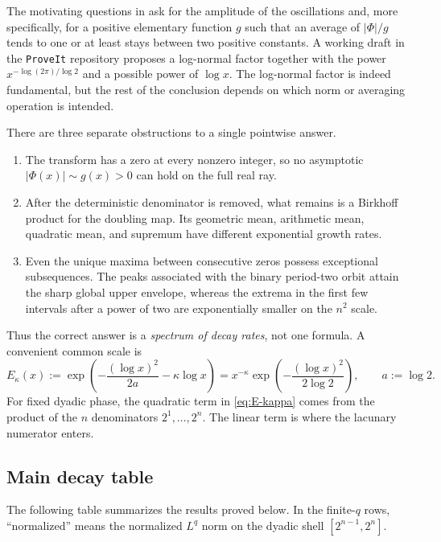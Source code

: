 \documentclass[11pt,oneside]{article}
\theoremstyle{definition}
\theoremstyle{remark}
\newcommand{\Phiup}{\Phi}
\newcommand{\abs}[1]{\left|#1\right|}
\begin{document}
The motivating questions in \cite{mse-extrema,mse-decay} ask for the amplitude of the
oscillations and, more specifically, for a positive elementary function $g$ such that an
average of $\abs{\Phiup}/g$ tends to one or at least stays between two positive constants.
A working draft in the \texttt{ProveIt} repository \cite{decay-draft} proposes a log-normal
factor together with the power $x^{-\log(2\pi)/\log2}$ and a possible power of $\log x$.
The log-normal factor is indeed fundamental, but the rest of the conclusion depends on
which norm or averaging operation is intended.

There are three separate obstructions to a single pointwise answer.

\begin{enumerate}
\item The transform has a zero at every nonzero integer, so no asymptotic
      $\abs{\Phiup(x)}\sim g(x)>0$ can hold on the full real ray.
\item After the deterministic denominator is removed, what remains is a Birkhoff product
      for the doubling map.  Its geometric mean, arithmetic mean, quadratic mean, and
      supremum have different exponential growth rates.
\item Even the unique maxima between consecutive zeros possess exceptional subsequences.
      The peaks associated with the binary period-two orbit attain the sharp global upper
      envelope, whereas the extrema in the first few intervals after a power of two are
      exponentially smaller on the $n^2$ scale.
\end{enumerate}

Thus the correct answer is a \emph{spectrum of decay rates}, not one formula.  A convenient
common scale is
\begin{equation}
 E_\kappa(x)
 :=\exp\!\left(-\frac{(\log x)^2}{2a}-\kappa\log x\right)
 =x^{-\kappa}\exp\!\left(-\frac{(\log x)^2}{2\log2}\right),
 \qquad a:=\log2.
 \label{eq:E-kappa}
\end{equation}
For fixed dyadic phase, the quadratic term in \eqref{eq:E-kappa} comes from the product of
the $n$ denominators $2^1,\dots,2^n$.  The linear term is where the lacunary numerator
enters.

\subsection{Main decay table}
\label{subsec:main-table}

The following table summarizes the results proved below.  In the finite-$q$ rows,
``normalized'' means the normalized $L^q$ norm on the dyadic shell
$[2^{n-1},2^n]$.
\end{document}
